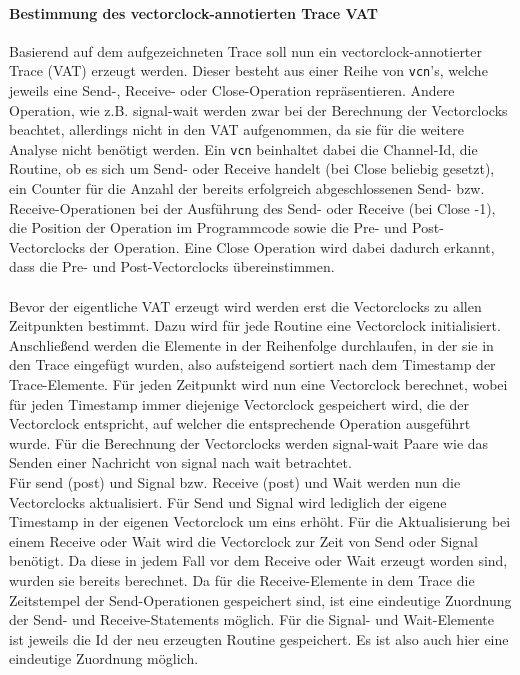 \paragraph{Bestimmung des vectorclock-annotierten Trace VAT}
Basierend auf dem aufgezeichneten Trace soll nun ein vectorclock-annotierter Trace 
(VAT) erzeugt werden. Dieser besteht aus einer Reihe von \texttt{vcn}'s, 
welche jeweils eine Send-, Receive- oder Close-Operation repräsentieren.
Andere Operation, wie z.B. signal-wait werden zwar bei der Berechnung der Vectorclocks 
beachtet, allerdings nicht in den VAT aufgenommen, da sie für die weitere 
Analyse nicht benötigt werden. Ein \texttt{vcn} beinhaltet dabei die Channel-Id,
die Routine, ob es sich um Send- oder Receive handelt (bei Close beliebig gesetzt),
ein Counter für die Anzahl der bereits erfolgreich abgeschlossenen Send- bzw.
Receive-Operationen bei der Ausführung des Send- oder Receive (bei Close -1), 
die Position der Operation im Programmcode
sowie die Pre- und Post-Vectorclocks der Operation. Eine Close Operation 
wird dabei dadurch erkannt, dass die Pre- und Post-Vectorclocks übereinstimmen.\\\\
Bevor der eigentliche VAT erzeugt wird werden erst die Vectorclocks zu allen
Zeitpunkten bestimmt. Dazu wird für jede Routine eine Vectorclock initialisiert. 
Anschließend werden die Elemente in der Reihenfolge durchlaufen, in der sie 
in den Trace eingefügt wurden, also aufsteigend sortiert nach dem Timestamp 
der Trace-Elemente. Für jeden Zeitpunkt wird nun eine Vectorclock berechnet,
wobei für jeden Timestamp immer diejenige Vectorclock gespeichert wird, die 
der Vectorclock entspricht, auf welcher die entsprechende Operation ausgeführt wurde.
Für die Berechnung der Vectorclocks werden signal-wait Paare wie das Senden 
einer Nachricht von signal nach wait betrachtet.\\
Für send (post) und Signal bzw. Receive (post) und Wait werden nun die Vectorclocks 
aktualisiert.
Für Send und Signal wird lediglich der eigene Timestamp in der eigenen 
Vectorclock um eins erhöht. Für die Aktualisierung bei einem Receive oder Wait 
wird die Vectorclock zur Zeit von Send oder Signal benötigt. Da diese in jedem 
Fall vor dem Receive oder Wait erzeugt worden sind, wurden sie bereits berechnet.
Da für die Receive-Elemente in dem Trace die Zeitstempel der Send-Operationen 
gespeichert sind, ist eine eindeutige Zuordnung der Send- und Receive-Statements 
möglich. Für die Signal- und Wait-Elemente ist jeweils die Id der neu erzeugten 
Routine gespeichert. Es ist also auch hier eine eindeutige Zuordnung möglich. 
